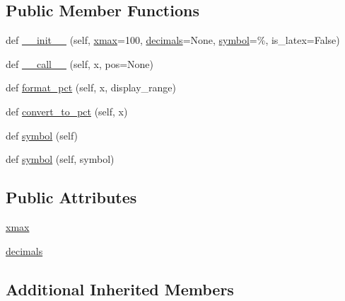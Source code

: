 \subsection*{Public Member Functions}
\begin{DoxyCompactItemize}
\item 
def \hyperlink{classmatplotlib_1_1ticker_1_1PercentFormatter_a8e38268a75407946f8f8ce4d98dad562}{\+\_\+\+\_\+init\+\_\+\+\_\+} (self, \hyperlink{classmatplotlib_1_1ticker_1_1PercentFormatter_a6fa868c350ce773fc3c0a72e2c60a8a6}{xmax}=100, \hyperlink{classmatplotlib_1_1ticker_1_1PercentFormatter_ac2e325288ffe1238ce69b87a139c4869}{decimals}=None, \hyperlink{classmatplotlib_1_1ticker_1_1PercentFormatter_aaef19a9c79b4051f06e4709c71378ee0}{symbol}=\textquotesingle{}\%\textquotesingle{}, is\+\_\+latex=False)
\item 
def \hyperlink{classmatplotlib_1_1ticker_1_1PercentFormatter_abd7ea85d4160412336d523f7e0f6cd8b}{\+\_\+\+\_\+call\+\_\+\+\_\+} (self, x, pos=None)
\item 
def \hyperlink{classmatplotlib_1_1ticker_1_1PercentFormatter_a370694639d8af031f543d1927a764460}{format\+\_\+pct} (self, x, display\+\_\+range)
\item 
def \hyperlink{classmatplotlib_1_1ticker_1_1PercentFormatter_ab3337fd338009d1c3bf68f346b236256}{convert\+\_\+to\+\_\+pct} (self, x)
\item 
def \hyperlink{classmatplotlib_1_1ticker_1_1PercentFormatter_aaef19a9c79b4051f06e4709c71378ee0}{symbol} (self)
\item 
def \hyperlink{classmatplotlib_1_1ticker_1_1PercentFormatter_ad89598b89c800715e919690ca2d45be9}{symbol} (self, symbol)
\end{DoxyCompactItemize}
\subsection*{Public Attributes}
\begin{DoxyCompactItemize}
\item 
\hyperlink{classmatplotlib_1_1ticker_1_1PercentFormatter_a6fa868c350ce773fc3c0a72e2c60a8a6}{xmax}
\item 
\hyperlink{classmatplotlib_1_1ticker_1_1PercentFormatter_ac2e325288ffe1238ce69b87a139c4869}{decimals}
\end{DoxyCompactItemize}
\subsection*{Additional Inherited Members}


